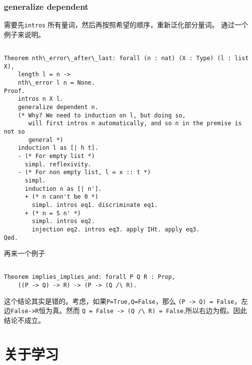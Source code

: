\documentclass{book}
\begin{document}
\subsection{generalize dependent}
需要先\verb|intros| 所有量词，然后再按照希望的顺序，重新泛化部分量词。
通过一个例子来说明。
\begin{lstlisting}[language=Coq]

Theorem nth\_error\_after\_last: forall (n : nat) (X : Type) (l : list X),
    length l = n ->
    nth\_error l n = None.
Proof.
    intros n X l.
    generalize dependent n.
    (* Why? We need to induction on l, but doing so,
       will first intros n automatically, and so n in the premise is not so
       general *)
    induction l as [| h t].
    - (* For empty list *)
      simpl. reflexivity.
    - (* For non empty list, l = x :: t *)
      simpl.
      induction n as [| n'].
      + (* n cann't be 0 *)
        simpl. intros eq1. discriminate eq1.
      + (* n = S n' *)
        simpl. intros eq2.
        injection eq2. intros eq3. apply IHt. apply eq3.
Qed.
\end{lstlisting}

再来一个例子
\begin{lstlisting}[language=Coq]%

Theorem implies_implies_and: forall P Q R : Prop,
    ((P -> Q) -> R) -> (P -> (Q /\ R).
\end{lstlisting}

这个结论其实是错的。考虑，如果\verb|P=True,Q=False|，那么
\lstinline[language=Coq]|(P -> Q) = False|，左边\lstinline[language=Coq]|False->R|恒为真。然而
\lstinline[language=Coq]|Q = False -> (Q /\ R) = False|,所以右边为假。因此结论不成立。

\chapter{关于学习}
\end{document}
